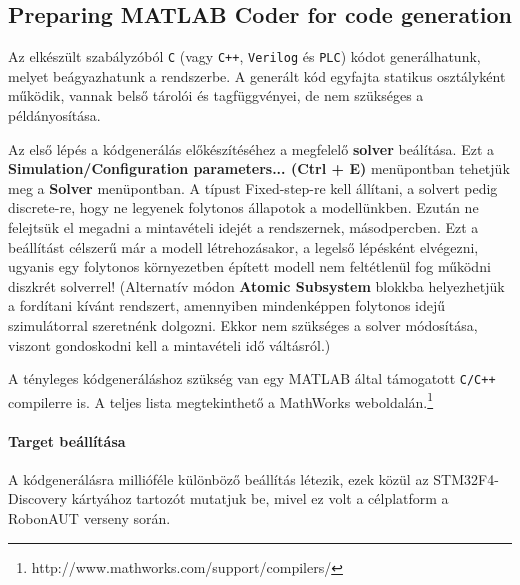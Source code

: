 \subsection{Preparing MATLAB Coder for code generation}

Az elkészült szabályzóból \verb!C! (vagy \verb!C++!, \verb!Verilog! és \verb!PLC!) kódot generálhatunk, melyet beágyazhatunk a rendszerbe. A generált kód egyfajta statikus osztályként működik, vannak belső tárolói és tagfüggvényei, de nem szükséges a példányosítása.

Az első lépés a kódgenerálás előkészítéséhez a megfelelő \textbf{solver} beálítása. Ezt a \textbf{Simulation/Configuration parameters... (Ctrl + E)} menüpontban tehetjük meg a \textbf{Solver} menüpontban. A típust Fixed-step-re kell állítani, a solvert pedig discrete-re, hogy ne legyenek folytonos állapotok a modellünkben. Ezután ne felejtsük el megadni a mintavételi idejét a rendszernek, másodpercben.
Ezt a beállítást célszerű már a modell létrehozásakor, a legelső lépésként elvégezni, ugyanis egy folytonos környezetben épített modell nem feltétlenül fog működni diszkrét solverrel! (Alternatív módon \textbf{Atomic Subsystem} blokkba helyezhetjük a fordítani kívánt rendszert, amennyiben mindenképpen folytonos idejű szimulátorral szeretnénk dolgozni. Ekkor nem szükséges a solver módosítása, viszont gondoskodni kell a mintavételi idő váltásról.)

A tényleges kódgeneráláshoz szükség van egy MATLAB által támogatott \verb!C/C++! compilerre is. A teljes lista megtekinthető a MathWorks weboldalán.\footnote{http://www.mathworks.com/support/compilers/}

\paragraph{Target beállítása}

A kódgenerálásra millióféle különböző beállítás létezik, ezek közül az STM32F4-Discovery kártyához tartozót mutatjuk be, mivel ez volt a célplatform a RobonAUT verseny során.

